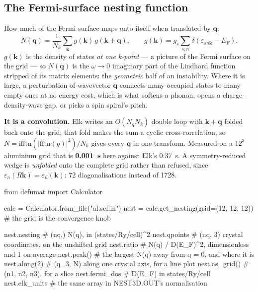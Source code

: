 \documentclass[11pt,a4paper]{article}
\begin{document}
\subsection{The Fermi-surface nesting function}

How much of the Fermi surface maps onto itself when translated by $\mathbf q$:
\begin{equation*}
  N(\mathbf q) = \frac{1}{N_k}\sum_{\mathbf k} g(\mathbf k)\, g(\mathbf k + \mathbf q),
  \qquad
  g(\mathbf k) = g_s \sum_{s,n} \delta(\varepsilon_{sn\mathbf k} - E_F).
\end{equation*}
$g(\mathbf k)$ is the density of states \emph{at one k-point} --- a picture of
the Fermi surface on the grid --- so $N(\mathbf q)$ is the $\omega\to0$
imaginary part of the Lindhard function stripped of its matrix elements: the
\emph{geometric} half of an instability. Where it is large, a perturbation of
wavevector $\mathbf q$ connects many occupied states to many empty ones at no
energy cost, which is what softens a phonon, opens a charge-density-wave gap, or
picks a spin spiral's pitch.

\textbf{It is a convolution.} Elk writes an $O(N_q N_k)$ double loop with
$\mathbf k + \mathbf q$ folded back onto the grid; that fold makes the sum a
cyclic cross-correlation, so $N = \mathrm{ifftn}(|\mathrm{fftn}(g)|^2)/N_k$
gives every $\mathbf q$ in one transform. Measured on a $12^3$ aluminium grid
that is \textbf{0.001~s} here against Elk's 0.37~s. A symmetry-reduced wedge is
\emph{unfolded} onto the complete grid rather than refused, since
$\varepsilon_n(R\mathbf k) = \varepsilon_n(\mathbf k)$: 72 diagonalisations
instead of 1728.

\begin{pycode}
from defumat import Calculator

calc = Calculator.from_file("al.scf.in")
nest = calc.get_nesting(grid=(12, 12, 12))   # the grid is the convergence knob

nest.nesting        # (nq,) N(q), in (states/Ry/cell)^2
nest.qpoints        # (nq, 3) crystal coordinates, on the unshifted grid
nest.ratio          # N(q) / D(E_F)^2, dimensionless and 1 on average
nest.peak()         # the largest N(q) away from q = 0, and where it is
nest.along(2)       # (q_3, N) along one crystal axis, for a line plot
nest.as_grid()      # (n1, n2, n3), for a slice
nest.fermi_dos      # D(E_F) in states/Ry/cell
nest.elk_units      # the same array in NEST3D.OUT's normalisation
\end{pycode}
\end{document}
